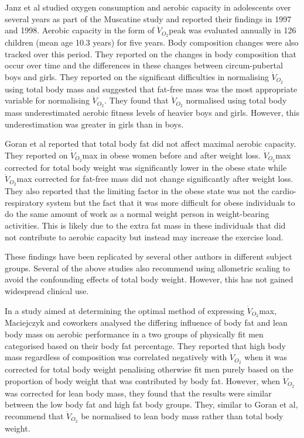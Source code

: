 Janz et al studied oxygen consumption and aerobic capacity in adolescents over several years as part of the Muscatine study and reported their findings in 1997\parencite{janz_three-year_1997} and 1998.\parencite{janz_longitudinal_1998} Aerobic capacity in the form of $\dot{V}_{O_2}$peak was evaluated annually in 126 children (mean age 10.3 years) for five years. Body composition changes were also tracked over this period. They reported on the changes in body composition that occur over time and the differences in these changes between circum-pubertal boys and girls. They reported on the significant difficulties in normalising $\dot{V}_{O_2}$ using total body mass and suggested that fat-free mass was the most appropriate variable for normalising $\dot{V}_{O_2}$. They found that $\dot{V}_{O_2}$ normalised using total body mass underestimated aerobic fitness levels of heavier boys and girls. However, this underestimation was greater in girls than in boys. 

Goran et al reported that total body fat did not affect maximal aerobic capacity.\parencite{goran_total_2000} They reported on $\dot{V}_{O_2}$max in obese women before and after weight loss. $\dot{V}_{O_2}$max corrected for total body weight was significantly lower in the obese state while $\dot{V}_{O_2}$max corrected for fat-free mass did not change significantly after weight loss. They also reported that the limiting factor in the obese state was not the cardio-respiratory system but the fact that it was more difficult for obese individuals to do the same amount of work as a normal weight person in weight-bearing activities. This is likely due to the extra fat mass in these individuals that did not contribute to aerobic capacity but instead may increase the exercise load.

These findings have been replicated by several other authors in different subject groups.\parencite{loftin_scaling_2001,  lemaitre_maximum_2006,savonen_current_2012, krachler_cardiopulmonary_2014} Several of the above studies also recommend using allometric scaling to avoid the confounding effects of total body weight. However, this has not gained widespread clinical use.

In a study aimed at determining the optimal method of expressing $\dot{V}_{O_2}$max, Maciejczyk and coworkers analysed the differing influence of body fat and lean body mass on aerobic performance in a two groups of physically fit men categorised based on their body fat percentage.\parencite{maciejczyk_influence_2014} They reported that high body mass regardless of composition was correlated negatively with $\dot{V}_{O_2}$ when it was corrected for total body weight penalising otherwise fit men purely based on the proportion of body weight that was contributed by body fat. However, when $\dot{V}_{O_2}$ was corrected for lean body mass, they found that the results were similar between the low body fat and high fat body groups. They, similar to Goran et al\parencite{goran_total_2000}, recommend that $\dot{V}_{O_2}$ be normalised to lean body mass rather than total body weight.

